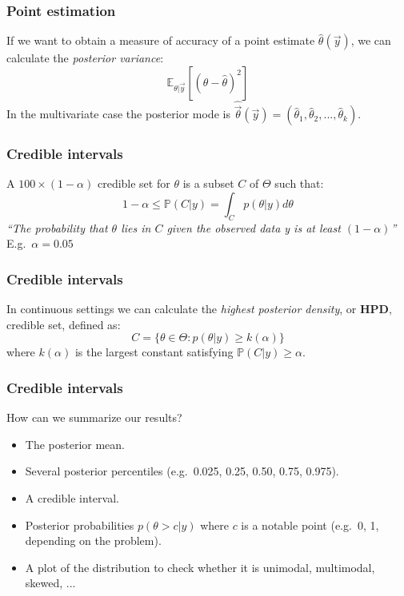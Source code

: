 \documentclass{beamer}
\renewcommand{\P}{\mathbb{P}}
\newcommand{\E}{\mathbb{E}}
\newcommand{\1}{\ensuremath{\mathbf{1}}}
\begin{document}
%
%
%
\begin{frame}\frametitle{Point estimation}
	If we want to obtain a measure of accuracy of a point estimate $\hat\theta(\vec{y})$, we can calculate the \emph{posterior variance}:
	\begin{equation}
		\E_{\theta|\vec{y}}[(\theta-\hat\theta)^2]
	\end{equation}
	In the multivariate case the posterior mode is $\hat{\vec{\theta}}(\vec{y}) = (\hat\theta_1,\hat\theta_2,...,\hat\theta_k)$.
\end{frame}
%
%
%
\begin{frame}\frametitle{Credible intervals}
	A $100\times(1-\alpha)$ credible set for $\theta$ is a subset $C$ of $\Theta$ such that:
	\begin{equation}
		1 - \alpha \leq \P(C|y) = \int_C p(\theta|y) d\theta
	\end{equation}
	\emph{``The probability that $\theta$ lies in $C$ given the observed data y is at least $(1 - \alpha)$''}\\[1.5ex]
	E.g.\ $\alpha = 0.05$
\end{frame}
%
%
%
\begin{frame}\frametitle{Credible intervals}
	In continuous settings we can calculate the \emph{highest posterior density}, or \textbf{HPD}, credible set, defined as:
	\begin{equation}
		C = \{\theta \in \Theta : p(\theta|y) \geq k(\alpha)\}
	\end{equation}
	where $k(\alpha)$ is the largest constant satisfying $\P(C|y) \geq \alpha$.\\[2ex]
\end{frame}
%
%
%
\begin{frame}\frametitle{Credible intervals}
	How can we summarize our results?
	\begin{itemize}
		\item The posterior mean.
		\item Several posterior percentiles (e.g.\ 0.025, 0.25, 0.50, 0.75, 0.975).
		\item A credible interval.
		\item Posterior probabilities $p(\theta > c|y)$ where $c$ is a notable point (e.g.\ 0, 1, depending on the problem).
		\item A plot of the distribution to check whether it is unimodal, multimodal, skewed, ...
	\end{itemize}
\end{frame}
\end{document}
